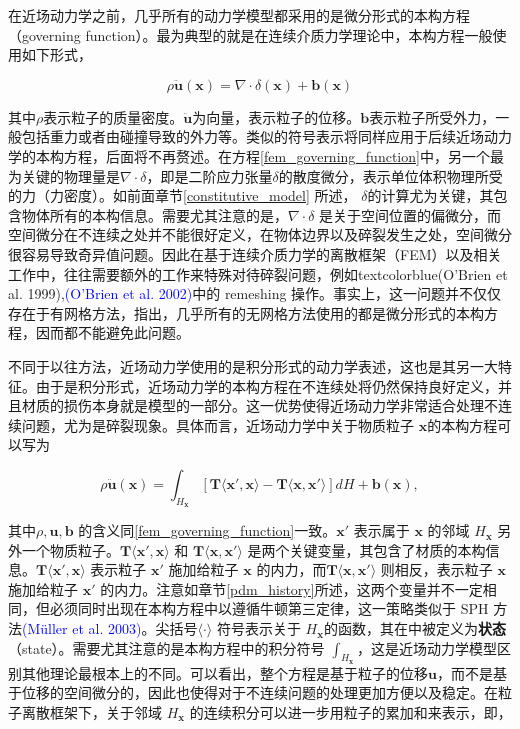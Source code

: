 在近场动力学之前，几乎所有的动力学模型都采用的是微分形式的本构方程（governing function）。最为典型的就是在连续介质力学理论中，本构方程一般使用如下形式，

\begin{equation}
\label{fem_governing_function}
\rho\ddot{\mathbf{u}}(\mathbf{x}) = \nabla\cdot\delta(\mathbf{x})+\mathbf{b}(\mathbf{x})
\end{equation}

其中$\rho$表示粒子的质量密度。$\ddot{\mathbf{u}}$为向量，表示粒子的位移。$\mathbf{b}$表示粒子所受外力，一般包括重力或者由碰撞导致的外力等。类似的符号表示将同样应用于后续近场动力学的本构方程，后面将不再赘述。在方程\ref{fem_governing_function}中，另一个最为关键的物理量是$\nabla\cdot\delta$，即是二阶应力张量$\delta$的散度微分，表示单位体积物理所受的力（力密度）。如前面章节\ref{constitutive_model} 所述， $\delta$的计算尤为关键，其包含物体所有的本构信息。需要尤其注意的是，$\nabla\cdot\delta$ 是关于空间位置的偏微分，而空间微分在不连续之处并不能很好定义，在物体边界以及碎裂发生之处，空间微分很容易导致奇异值问题。因此在基于连续介质力学的离散框架（FEM）以及相关工作中，往往需要额外的工作来特殊对待碎裂问题，例如textcolor{blue}{(O'Brien et al. 1999)\parencite{OBrien1999}},\textcolor{blue}{(O'Brien et al. 2002)\parencite{OBrien2002}}中的 remeshing 操作。事实上，这一问题并不仅仅存在于有网格方法，指出，几乎所有的无网格方法使用的都是微分形式的本构方程，因而都不能避免此问题。

不同于以往方法，近场动力学使用的是积分形式的动力学表述，这也是其另一大特征。由于是积分形式，近场动力学的本构方程在不连续处将仍然保持良好定义，并且材质的损伤本身就是模型的一部分。这一优势使得近场动力学非常适合处理不连续问题，尤为是碎裂现象。具体而言，近场动力学中关于物质粒子 $\mathbf{x}$的本构方程可以写为

\begin{equation}
\rho\ddot{\mathbf{u}}(\mathbf{x}) = \int_{H_\mathbf{x}}[\mathbf{T}\langle\mathbf{x}',\mathbf{x}\rangle - \mathbf{T}\langle\mathbf{x},\mathbf{x}'\rangle]dH+\mathbf{b}(\mathbf{x}),
\label{pdm_governing_function}
\end{equation}

其中$\rho, \mathbf{u}, \mathbf{b}$ 的含义同\ref{fem_governing_function}一致。$\mathbf{x}'$ 表示属于 $\mathbf{x}$ 的邻域 $H_\mathbf{x}$ 另外一个物质粒子。$\mathbf{T}\langle\mathbf{x}',\mathbf{x}\rangle$ 和 $\mathbf{T}\langle\mathbf{x},\mathbf{x}'\rangle$ 是两个关键变量，其包含了材质的本构信息。$\mathbf{T}\langle\mathbf{x}',\mathbf{x}\rangle$ 表示粒子 $\mathbf{x}'$ 施加给粒子 $\mathbf{x}$ 的内力，而$\mathbf{T}\langle\mathbf{x},\mathbf{x}'\rangle$ 则相反，表示粒子 $\mathbf{x}$ 施加给粒子 $\mathbf{x}'$ 的内力。注意如章节\ref{pdm_history}所述，这两个变量并不一定相同，但必须同时出现在本构方程中以遵循牛顿第三定律，这一策略类似于 SPH 方法\textcolor{blue}{(M\"{u}ller et al. 2003)\parencite{Muller2003}}。尖括号$\langle\cdot\rangle$ 符号表示关于 $H_\mathbf{x}$的函数，其在中被定义为\textbf{状态}（state）。需要尤其注意的是本构方程中的积分符号 $\int_{H_\mathbf{x}}$，这是近场动力学模型区别其他理论最根本上的不同。可以看出，整个方程是基于粒子的位移$\mathbf{u}$，而不是基于位移的空间微分的，因此也使得对于不连续问题的处理更加方便以及稳定。在粒子离散框架下，关于邻域 $H_\mathbf{x}$ 的连续积分可以进一步用粒子的累加和来表示，即，

